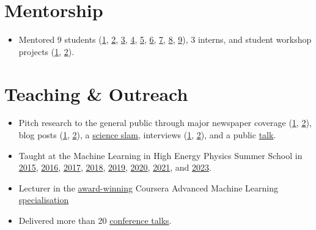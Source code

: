 \documentclass[11pt,a4paper]{article}
\begin{document}
\section{Mentorship}
\begin{itemize}
  \item Mentored 9 students (\href{https://www.hse.ru/edu/vkr/219430466}{1}, \href{https://www.hse.ru/edu/vkr/296294066}{2}, \href{https://www.hse.ru/edu/vkr/219524130}{3}, \href{https://www.hse.ru/en/edu/vkr/470561417}{4}, \href{https://www.hse.ru/en/edu/vkr/470935224}{5}, \href{https://www.hse.ru/ma/datasci/students/diplomas/631565328}{6}, \href{https://www.hse.ru/ma/datasci/students/diplomas/631565422}{7}, \href{https://www.hse.ru/edu/vkr/624890096}{8}, \href{https://www.hse.ru/ba/ami/students/diplomas/834351454}{9}), 3 interns, and student workshop projects (\href{https://sochisirius.ru/news/3148}{1}, \href{https://web.archive.org/web/20220512040654/https://academy.yandex.ru/posts/vossozdat-arkhitekturu-bazy-dannykh-i-nauchit-golosovogo-pomoschnika-predskazyvat-namereniya-polzovatelya}{2}).
\end{itemize}
\section{Teaching \& Outreach}
\begin{itemize}
  \item Pitch research to the general public through major newspaper coverage (\href{https://www.kommersant.ru/doc/7832307}{1}, \href{https://www.kommersant.ru/doc/6122817}{2}), blog posts (\href{https://ifim.nus.edu.sg/tailor-made-2d-materials-became-closer-with-the-new-machine-learning-algorithm-developed-at-nus/}{1}, \href{https://communities.springernature.com/posts/sparse-representation-for-machine-learning-the-properties-of-defects-in-2d-materials}{2}), a \href{https://elementy.ru/events/435506/IV\_Nauchnye\_boi\_NIU\_VShE\_na\_Dne\_Vyshki}{science slam}, interviews (\href{https://web.archive.org/web/20210518043835/https://academy.yandex.ru/posts/beresh-i-razbiraeshsya}{1}, \href{https://habr.com/en/company/yandex/blog/422761/}{2}), and a public \href{https://www.youtube.com/watch?v=zLFZ\_z-7-JI&feature=youtu.be&t=7779}{talk}.
  \item Taught at the Machine Learning in High Energy Physics Summer School in \href{https://indico.cern.ch/event/439520/}{2015}, \href{https://indico.cern.ch/event/497368/}{2016}, \href{https://indico.cern.ch/event/613571/}{2017}, \href{https://indico.cern.ch/event/687473/}{2018}, \href{https://indico.cern.ch/event/768915/}{2019}, \href{https://indico.cern.ch/event/838377/}{2020}, \href{https://indico.cern.ch/event/1025052/}{2021}, and \href{https://indico.cern.ch/event/1229514/}{2023}.
  \item Lecturer in the \href{https://www.hse.ru/en/news/edu/259378493.html}{award-winning} Coursera Advanced Machine Learning \href{https://web.archive.org/web/20220127183223/https://www.coursera.org/specializations/aml}{  specialisation}
  \item Delivered more than 20 \href{https://docs.google.com/document/d/1IOlBse4q0YgEoL\_RCJTvJfbFhFaD\_YMAIJJ3W77B\_X0/edit?usp=sharing}{conference talks}.
\end{itemize}
\end{document}
